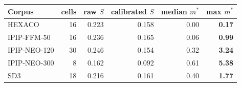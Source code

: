 \begin{tabular}{lrrrrr}
\toprule
Corpus & cells & raw $S$ & calibrated $S$ & median $m^{*}$ & max $m^{*}$\\
\midrule
HEXACO & 16 & 0.223 & 0.158 & 0.00 & \textbf{0.17}\\
IPIP-FFM-50 & 16 & 0.236 & 0.165 & 0.06 & \textbf{0.99}\\
IPIP-NEO-120 & 30 & 0.246 & 0.154 & 0.32 & \textbf{3.24}\\
IPIP-NEO-300 & 8 & 0.162 & 0.092 & 0.61 & \textbf{5.38}\\
SD3 & 18 & 0.216 & 0.161 & 0.40 & \textbf{1.77}\\
\bottomrule
\end{tabular}